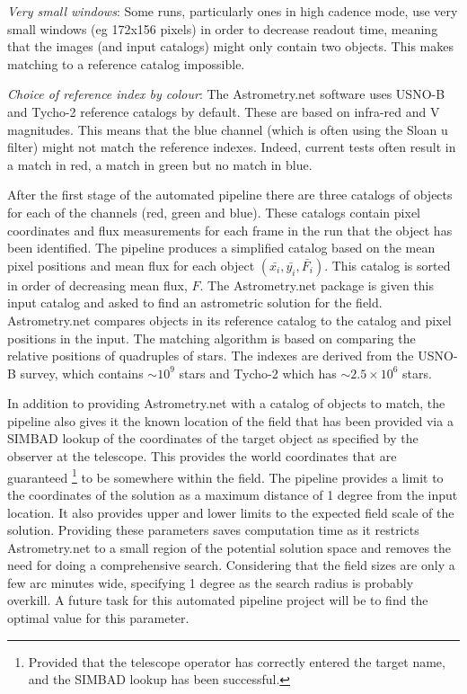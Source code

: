 \emph{Very small windows}: Some runs, particularly ones in high cadence mode, use very small windows (eg 172x156 pixels) in order to decrease readout time, meaning that the images (and input catalogs) might only contain two objects. This makes matching to a reference catalog impossible. 

\emph{Choice of reference index by colour}: The Astrometry.net software uses USNO-B and Tycho-2 reference catalogs by default. These are based on infra-red and V magnitudes. This means that the blue channel (which is often using the Sloan u filter) might not match the reference indexes. Indeed, current tests often result in a match in red, a match in green but no match in blue. 

After the first stage of the automated pipeline there are three catalogs of objects for each of the channels (red, green and blue). These catalogs contain pixel coordinates and flux measurements for each frame in the run that the object has been identified. The pipeline produces a simplified catalog based on the mean pixel positions and mean flux for each object $(\bar{x_i}, \bar{y_i}, \bar{F_i})$. This catalog is sorted in order of decreasing mean flux, $F$. The Astrometry.net package is given this input catalog and asked to find an astrometric solution for the field.  Astrometry.net compares objects in its reference catalog to the catalog and pixel positions in the input. The matching algorithm is based on comparing the relative positions of quadruples of stars. The indexes are derived from the USNO-B survey, which contains $\sim10^9$ stars and Tycho-2 which has $\sim2.5\times10^6$ stars. 

In addition to providing Astrometry.net with a catalog of objects to match, the pipeline also gives it the known location of the field that has been provided via a SIMBAD lookup of the coordinates of the target object as specified by the observer at the telescope. This provides the world coordinates that are guaranteed \footnote{Provided that the telescope operator has correctly entered the target name, and the SIMBAD lookup has been successful.} to be somewhere within the field. The pipeline provides a limit to the coordinates of the solution as a maximum distance of 1 degree from the input location. It also provides upper and lower limits to the expected field scale of the solution. Providing these parameters saves computation time as it restricts Astrometry.net to a small region of the potential solution space and removes the need for doing a comprehensive search. Considering that the field sizes are only a few arc minutes wide, specifying 1 degree as the search radius is probably overkill. A future task for this automated pipeline project will be to find the optimal value for this parameter.

